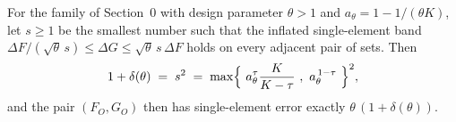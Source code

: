 \begin{lemma}\label{lem:n5-delta}
For the family of Section~0 with design parameter $\theta>1$ and
$a_\theta=1-1/(\theta K)$, let $s\ge 1$ be the smallest number such that the
inflated single-element band
$\Delta F/(\sqrt\theta\, s)\le \Delta G\le \sqrt\theta\, s\,\Delta F$ holds on
every adjacent pair of sets.  Then
\[
  1+\delta(\theta)\;=\;s^{2}\;=\;
  \max\Bigl\{\ a_\theta^{\tau}\frac{K}{K-\tau}\ ,\ a_\theta^{\,1-\tau}\ \Bigr\}^{2},
\]
and the pair $(F_O,G_O)$ then has single-element error exactly
$\theta\,(1+\delta(\theta))$.
\end{lemma}
